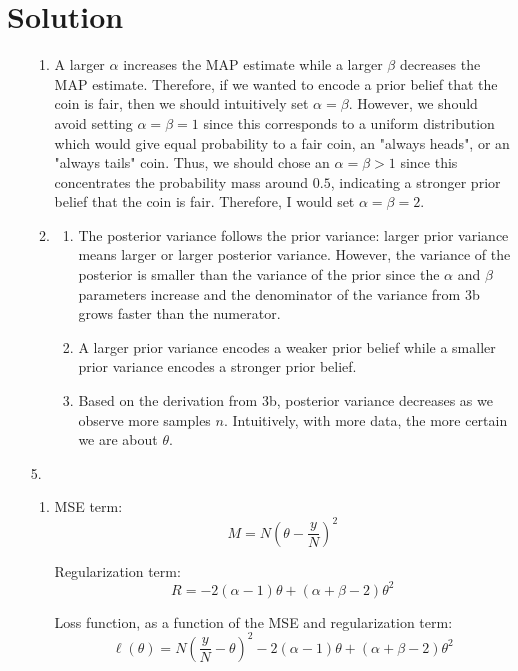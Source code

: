 \documentclass[submit]{../harvardml}
\newenvironment{answer}
  {\section*{Solution}}
{}
\begin{document}
\begin{answer}
\begin{enumerate}
      \begin{enumerate}
        \item
        A larger $\alpha$ increases the MAP estimate while a larger $\beta$ decreases the MAP estimate. Therefore, if we wanted to encode a prior belief that the coin is fair, then we should intuitively set $\alpha = \beta$. However, we should avoid setting $\alpha = \beta = 1$ since this corresponds to a uniform distribution which would give equal probability to a fair coin, an "always heads", or an "always tails" coin. Thus, we should chose an $\alpha = \beta > 1$ since this concentrates the probability mass around $0.5$, indicating a stronger prior belief that the coin is fair. Therefore, I would set $\alpha = \beta = 2$.
        \item
              \begin{enumerate}
                \item
                The posterior variance follows the prior variance: larger prior variance means larger or larger posterior variance. However, the variance of the posterior is smaller than the variance of the prior since the $\alpha$ and $\beta$ parameters increase and the denominator of the variance from 3b grows faster than the numerator. 
                \item
                A larger prior variance encodes a weaker prior belief while a smaller prior variance encodes a stronger prior belief.
                \item
                Based on the derivation from 3b, posterior variance decreases as we observe more samples $n$. Intuitively, with more data, the more certain we are about $\theta$.
              \end{enumerate}

      \end{enumerate}

    \item[5.]

      \begin{enumerate}
        \item
              MSE term:
              \[
                M = N(\theta - \frac{y}{N} )^2
              \]

              Regularization term:
              \[
                R = -2(\alpha-1)\theta + (\alpha+\beta-2)\theta^2
              \]

              Loss function, as a function of the MSE and regularization term:
              \[
                \ell(\theta) = N\left(\frac{y}{N} - \theta\right)^2 - 2(\alpha-1)\theta + (\alpha+\beta-2)\theta^2
              \]


\end{enumerate}
\end{enumerate}
\end{answer}
\end{document}
